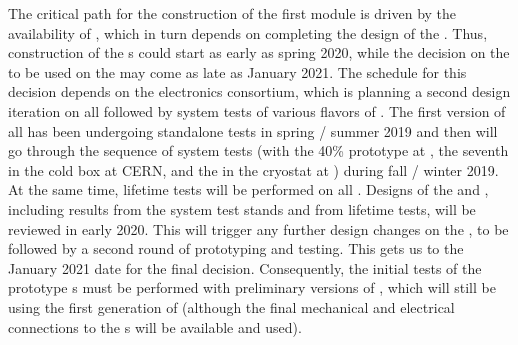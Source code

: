 The critical path for the construction of the first 
  module is driven by the availability of ,
which in turn depends on completing the design of the
. Thus, construction
of the s could start as early as spring 2020, while the
decision on the  to be used on the 
may come as late as January 2021. The schedule for this decision
depends on the  electronics consortium, which is
planning a second design iteration on all 
followed by system tests of various flavors of .
The first version of all  has been undergoing
standalone tests in spring / summer 2019 and then will go through the 
sequence of system tests (with the 40\%  prototype at ,
the seventh   in the cold box at CERN,
and the  in the  cryostat at )
during fall / winter 2019. At the same time, lifetime tests will be performed 
on all . Designs of the  and , including results
from the system test stands and from lifetime tests, will be reviewed
in early 2020. This will trigger any further design
changes on the , to be followed by a second round of prototyping
and testing. This gets us to the January 2021 date for the final
 decision. Consequently, the initial
tests of the  prototype s must be performed
with preliminary versions of , which will still be using
the first generation of  (although the final 
mechanical and electrical connections to the s will be available and used).

